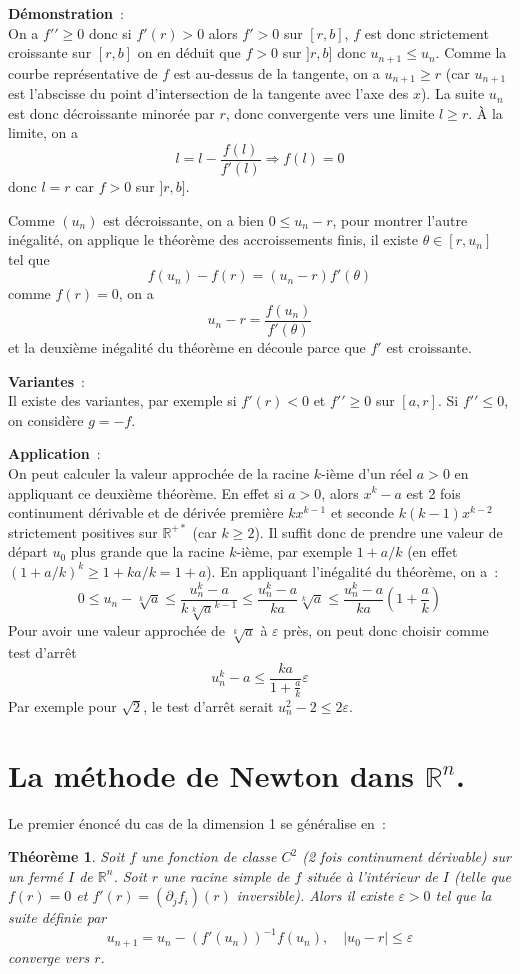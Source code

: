 \documentclass[a4paper,11pt]{book}
\newtheorem{thm}{Théorème}
\begin{document}
\begin{giacjshere}
{\bf Démonstration}~:\\
On a $f'{'} \geq 0$ donc si $f'(r)>0$ alors $f'>0$
sur $[r,b]$, $f$ est donc strictement croissante sur $[r,b]$
on en déduit que $f>0$ sur $]r,b]$ donc $u_{n+1} \leq u_n$.
Comme la courbe représentative de $f$ est au-dessus de la tangente,
on a $u_{n+1} \geq r$ (car $u_{n+1}$ est l'abscisse du point
d'intersection de la tangente avec l'axe des $x$). 
La suite $u_n$ est donc décroissante minorée par $r$, donc convergente
vers une limite $l\geq r$. \`A la limite, on a 
\[ l=l-\frac{f(l)}{f'(l)} \Rightarrow f(l)=0 \]
donc $l=r$ car $f>0$ sur $]r,b]$.

Comme $(u_n)$ est d\'ecroissante, on a bien $0 \leq u_n -r$,
pour montrer l'autre in\'egalit\'e, on applique le th\'eor\`eme
des accroissements finis, il existe $\theta \in [r,u_n]$ tel que
\[ f(u_n)-f(r)=(u_n-r)f'(\theta) \]
comme $f(r)=0$, on a
\[ u_n-r = \frac{f(u_n)}{f'(\theta)} \]
et la deuxi\`eme in\'egalit\'e du th\'eor\`eme
en d\'ecoule parce que $f'$ est croissante.

{\bf Variantes}~:\\
Il existe des variantes, par exemple si $f'(r)<0$ et $f'{'} \geq 0$
sur $[a,r]$. Si $f'{'} \leq 0$, on considère $g=-f$.

{\bf Application}~:\\
On peut calculer la valeur approch\'ee de la 
racine $k$-i\`eme d'un r\'eel $a>0$ en appliquant ce deuxi\`eme
th\'eor\`eme. En effet si
$a>0$, alors $x^k-a$ est 2 fois continument d\'erivable et 
de d\'eriv\'ee premi\`ere $kx^{k-1} $ et
seconde $k(k-1)x^{k-2}$ strictement positives sur $\mathbb{R}^{+\ast}$ (car $k \geq 2$).
Il suffit donc de prendre une valeur de d\'epart $u_0$ plus grande que
la racine $k$-i\`eme, par exemple $1+a/k$ (en effet
$(1+a/k)^k \geq 1+k a/k=1+a$).
En appliquant l'in\'egalit\'e du th\'eor\`eme, on a~:
\[ 0 \leq u_n - \sqrt[k]{a} \leq  
\frac{u_n^k - a}{k\sqrt[k]{a}^{k-1} }
\leq \frac{u_n^k-a}{ka}  \sqrt[k]{a}
\leq \frac{u_n^k-a}{ka} (1+\frac{a}{k})
\]
Pour avoir une valeur approch\'ee de $\sqrt[k]{a}$ \`a $\varepsilon$ pr\`es,
on peut donc choisir comme test d'arr\^et 
\[ u_n^k -a \leq \frac{ka}{1+\frac{a}{k}} \varepsilon \]
Par exemple pour $\sqrt{2}$, le test d'arr\^et serait 
$u_n^2-2 \leq 2 \varepsilon$.

\section{La m\'ethode de Newton dans $\mathbb{R}^n$.}
Le premier \'enonc\'e du cas de la dimension 1 se g\'en\'eralise en~:
\begin{thm} 
Soit $f$ une fonction de classe $C^2$ (2 fois continument d\'erivable)
sur un ferm\'e $I$ de $\mathbb{R}^n$. Soit $r$ une racine simple de $f$
situ\'ee \`a l'int\'erieur de $I$
(telle que $f(r)=0$ et $f'(r)=(\partial_j f_i)(r)$ inversible). 
Alors il existe $\varepsilon>0$
tel que la suite d\'efinie par
\[ u_{n+1} = u_n -(f'(u_n) )^{-1}f(u_n), \quad |u_0-r| \leq \varepsilon \]
converge vers $r$.


\end{thm}
\end{giacjshere}
\end{document}
